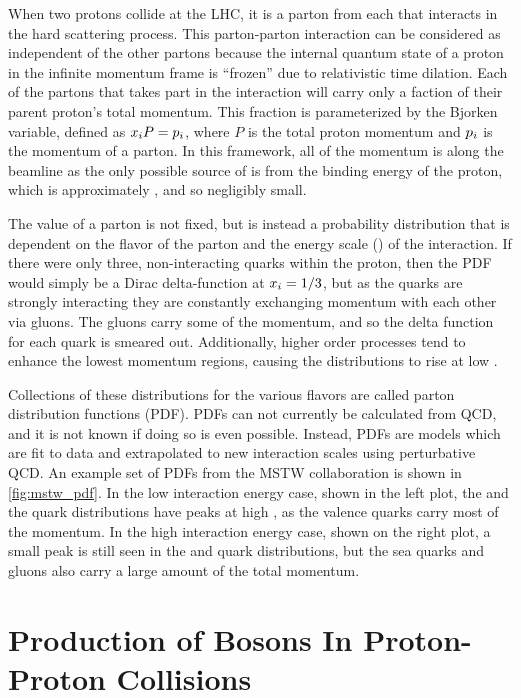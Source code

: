 When two protons collide at the LHC, it is a parton from each that interacts in
the hard scattering process. This parton-parton interaction can be considered
as independent of the other partons because the internal quantum state of a
proton in the infinite momentum frame is ``frozen'' due to relativistic time
dilation. Each of the partons that takes part in the interaction will carry
only a faction of their parent proton's total momentum. This fraction is
parameterized by the Bjorken  variable, defined as $x_{i} P
= p_{i}$, where $P$ is the total proton momentum and $p_{i}$ is the
momentum of a parton. In this framework, all of the momentum is along the
beamline as the only possible source of \pt is from the binding energy of the
proton, which is approximately \ProtonMass, and so negligibly small.

The  value of a parton is not fixed, but is instead a probability
distribution that is dependent on the flavor of the parton and the energy scale
(\InteractionEnergy) of the interaction. If there were only three,
non-interacting quarks within the proton, then the PDF would simply be a Dirac
delta-function at $x_{i} = 1/3$, but as the quarks are strongly
interacting they are constantly exchanging momentum with each other via gluons.
The gluons carry some of the momentum, and so the delta function for each quark
is smeared out. Additionally, higher order processes tend to enhance the lowest
momentum regions, causing the distributions to rise at low .

Collections of these distributions for the various flavors are called parton
distribution functions (PDF). PDFs can not currently be calculated from QCD,
and it is not known if doing so is even possible. Instead, PDFs are models
which are fit to data and extrapolated to new interaction scales using
perturbative QCD. An example set of PDFs from the MSTW
collaboration\cite{martin_2009} is shown in \cref{fig:mstw_pdf}. In the low
interaction energy case, shown in the left plot, the \upquark and the
\downquark quark distributions have peaks at high , as the valence
quarks carry most of the momentum. In the high interaction energy case, shown
on the right plot, a small peak is still seen in the \upquark and \downquark
quark distributions, but the sea quarks and gluons also carry a large amount of
the total momentum.



\section{Production of \texorpdfstring{\Z}{Z} Bosons In Proton-Proton Collisions}
\label{sec:z_production}

